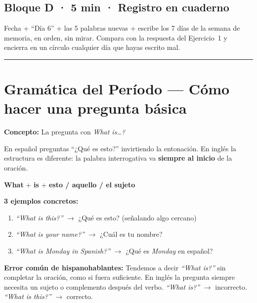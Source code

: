 \subsection*{Bloque D · 5 min · Registro en cuaderno}

\noindent
Fecha + ``Día 6'' + las 5 palabras nuevas + escribe los 7 días
de la semana de memoria, en orden, sin mirar.
Compara con la respuesta del Ejercicio~1 y encierra en un círculo
cualquier día que hayas escrito mal.

\bigskip
\noindent\rule{\textwidth}{0.4pt}

\section*{Gramática del Período — Cómo hacer una pregunta básica}
\label{sec:gramatica_periodo2}

\noindent
\textbf{Concepto:} La pregunta con \textit{What is\ldots?}

\medskip\noindent
En español preguntas ``¿Qué es esto?'' invirtiendo la entonación.
En inglés la estructura es diferente: la palabra interrogativa
va \textbf{siempre al inicio} de la oración.

\medskip
\begin{center}
  \large
  \textbf{What} \quad + \quad \textbf{is} \quad + \quad
  \textbf{esto / aquello / el sujeto}
\end{center}

\medskip\noindent
\textbf{3 ejemplos concretos:}

\begin{enumerate}
  \item \textit{``What is this?''} \quad $\rightarrow$ \quad
        ¿Qué es esto? (señalando algo cercano)
  \item \textit{``What is your name?''} \quad $\rightarrow$ \quad
        ¿Cuál es tu nombre?
  \item \textit{``What is Monday in Spanish?''} \quad $\rightarrow$ \quad
        ¿Qué es \textit{Monday} en español?
\end{enumerate}

\medskip\noindent
\textbf{Error común de hispanohablantes:}
Tendemos a decir \textit{``What is?''} sin completar la oración,
como si fuera suficiente.  En inglés la pregunta siempre necesita
un sujeto o complemento después del verbo.
\textit{``What is?''} $\rightarrow$ incorrecto. \quad
\textit{``What is this?''} $\rightarrow$ correcto.

